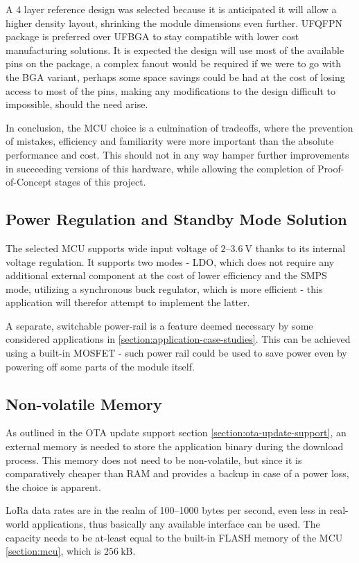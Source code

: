A 4 layer reference design was selected because it is anticipated it will allow a higher density layout, shrinking the module dimensions even further. UFQFPN package is preferred over UFBGA to stay compatible with lower cost manufacturing solutions. It is expected the design will use most of the available pins on the package, a complex fanout would be required if we were to go with the BGA variant, perhaps some space savings could be had at the cost of losing access to most of the pins, making any modifications to the design difficult to impossible, should the need arise.

In conclusion, the MCU choice is a culmination of tradeoffs, where the prevention of mistakes, efficiency and familiarity were more important than the absolute performance and cost. This should not in any way hamper further improvements in succeeding versions of this hardware, while allowing the completion of Proof-of-Concept stages of this project. 

\subsection{Power Regulation and Standby Mode Solution}
The selected MCU supports wide input voltage of $2\text{--}3.6~\mathrm{V}$ thanks to its internal voltage regulation. It supports two modes - LDO, which does not require any additional external component at the cost of lower efficiency and the SMPS mode, utilizing a synchronous buck regulator, which is more efficient - this application will therefor attempt to implement the latter.

A separate, switchable power-rail is a feature deemed necessary by some considered applications in \ref{section:application-case-studies}. This can be achieved using a built-in MOSFET - such power rail could be used to save power even by powering off some parts of the module itself.

\subsection{Non-volatile Memory}
As outlined in the OTA update support section \ref{section:ota-update-support}, an external memory is needed to store the application binary during the download process. This memory does not need to be non-volatile, but since it is comparatively cheaper than RAM and provides a backup in case of a power loss, the choice is apparent.

LoRa data rates are in the realm of 100--1000 bytes per second, even less in real-world applications, thus basically any available interface can be used. The capacity needs to be at-least equal to the built-in FLASH memory of the MCU \ref{section:mcu}, which is $256~\mathrm{kB}$.

